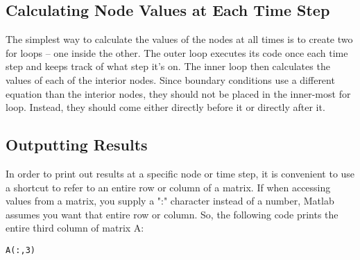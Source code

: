 \documentclass[11pt]{article}
\begin{document}
\subsection{Calculating Node Values at Each Time Step}
The simplest way to calculate the values of the nodes at all times is to create
two for loops -- one inside the other. The outer loop executes its code once
each time step and keeps track of what step it's on. The inner loop then
calculates the values of each of the interior nodes. Since boundary conditions
use a different equation than the interior nodes, they should not be placed in
the inner-most for loop. Instead, they should come either directly before it or
directly after it.

\subsection{Outputting Results}
In order to print out results at a specific node or time step, it is convenient
to use a shortcut to refer to an entire row or column of a matrix. If when
accessing values from a matrix, you supply a ":" character instead of a number,
Matlab assumes you want that entire row or column. So, the following code
prints the entire third column of matrix A:
\begin{lstlisting}
A(:,3)
\end{lstlisting}
\end{document}
